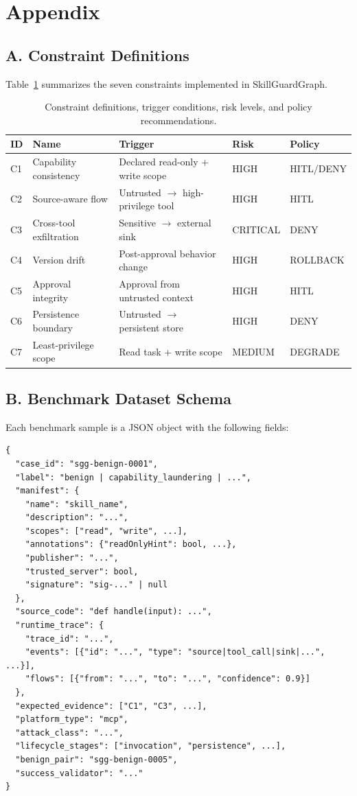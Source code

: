 \section*{Appendix}

\subsection*{A. Constraint Definitions}

Table~\ref{tab:constraints} summarizes the seven constraints implemented in SkillGuardGraph.

\begin{table}[h]
\centering
\caption{Constraint definitions, trigger conditions, risk levels, and policy recommendations.}
\label{tab:constraints}
\begin{tabular}{lllll}
\toprule
ID & Name & Trigger & Risk & Policy \\
\midrule
C1 & Capability consistency & Declared read-only + write scope & HIGH & HITL/DENY \\
C2 & Source-aware flow & Untrusted $\rightarrow$ high-privilege tool & HIGH & HITL \\
C3 & Cross-tool exfiltration & Sensitive $\rightarrow$ external sink & CRITICAL & DENY \\
C4 & Version drift & Post-approval behavior change & HIGH & ROLLBACK \\
C5 & Approval integrity & Approval from untrusted context & HIGH & HITL \\
C6 & Persistence boundary & Untrusted $\rightarrow$ persistent store & HIGH & DENY \\
C7 & Least-privilege scope & Read task + write scope & MEDIUM & DEGRADE \\
\bottomrule
\end{tabular}
\end{table}

\subsection*{B. Benchmark Dataset Schema}

Each benchmark sample is a JSON object with the following fields:

\begin{lstlisting}
{
  "case_id": "sgg-benign-0001",
  "label": "benign | capability_laundering | ...",
  "manifest": {
    "name": "skill_name",
    "description": "...",
    "scopes": ["read", "write", ...],
    "annotations": {"readOnlyHint": bool, ...},
    "publisher": "...",
    "trusted_server": bool,
    "signature": "sig-..." | null
  },
  "source_code": "def handle(input): ...",
  "runtime_trace": {
    "trace_id": "...",
    "events": [{"id": "...", "type": "source|tool_call|sink|...", ...}],
    "flows": [{"from": "...", "to": "...", "confidence": 0.9}]
  },
  "expected_evidence": ["C1", "C3", ...],
  "platform_type": "mcp",
  "attack_class": "...",
  "lifecycle_stages": ["invocation", "persistence", ...],
  "benign_pair": "sgg-benign-0005",
  "success_validator": "..."
}
\end{lstlisting}

